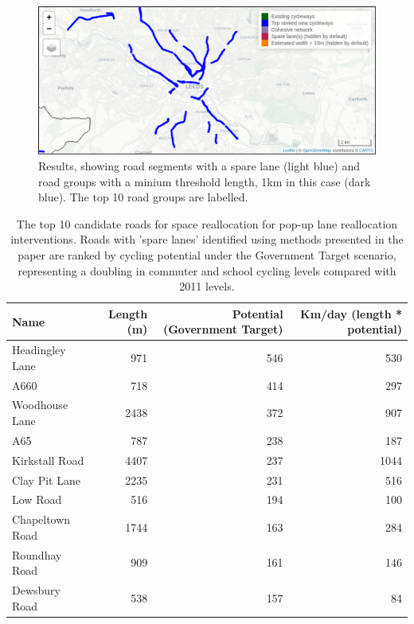 \documentclass[
]{article}
\begin{document}
\begin{figure}
\includegraphics[width=1\linewidth]{figures/results-top-leeds} \caption{Results, showing road segments with a spare lane (light blue) and road groups with a minium threshold length, 1km in this case (dark blue). The top 10 road groups are labelled.}\label{fig:res}
\end{figure}

\begin{table}

\caption{\label{tab:unnamed-chunk-2}The top 10 candidate roads for space reallocation for pop-up lane reallocation interventions. Roads with 'spare lanes' identified using methods presented in the paper are ranked by cycling potential under the Government Target scenario, representing a doubling in commuter and school cycling levels compared with 2011 levels.}
\centering
\begin{tabular}[t]{lrrr}
\toprule
Name & Length (m) & Potential (Government Target) & Km/day (length * potential)\\
\midrule
Headingley Lane & 971 & 546 & 530\\
A660 & 718 & 414 & 297\\
Woodhouse Lane & 2438 & 372 & 907\\
A65 & 787 & 238 & 187\\
Kirkstall Road & 4407 & 237 & 1044\\
\addlinespace
Clay Pit Lane & 2235 & 231 & 516\\
Low Road & 516 & 194 & 100\\
Chapeltown Road & 1744 & 163 & 284\\
Roundhay Road & 909 & 161 & 146\\
Dewsbury Road & 538 & 157 & 84\\
\bottomrule
\end{tabular}
\end{table}
\end{document}
